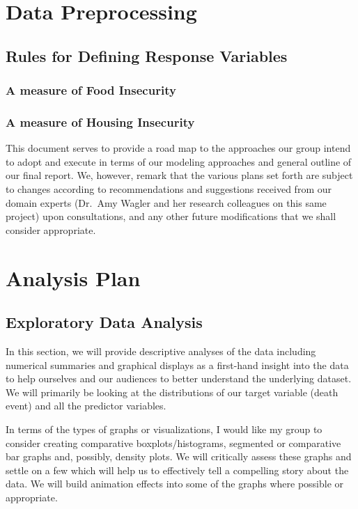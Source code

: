 \documentclass[
  10pt,
]{article}
\begin{document}
\section{Data Preprocessing}

\subsection{Rules for Defining Response Variables}

\subsubsection{A measure of Food Insecurity}

\subsubsection{A measure of Housing Insecurity}

This document serves to provide a road map to the approaches our group intend to adopt and execute in terms of our modeling approaches and general outline of our final report. We, however, remark that the various plans set forth are subject to changes according to recommendations and suggestions received from our domain experts (Dr.~Amy Wagler and her research colleagues on this same project) upon consultations, and any other future modifications that we shall consider appropriate.

\section{Analysis Plan}

\subsection{Exploratory Data Analysis}

In this section, we will provide descriptive analyses of the data including numerical summaries and graphical displays as a first-hand insight into the data to help ourselves and our audiences to better understand the underlying dataset. We will primarily be looking at the distributions of our target variable (death event) and all the predictor variables.

In terms of the types of graphs or visualizations, I would like my group to consider creating comparative boxplots/histograms, segmented or comparative bar graphs and, possibly, density plots. We will critically assess these graphs and settle on a few which will help us to effectively tell a compelling story about the data. We will build animation effects into some of the graphs where possible or appropriate.
\end{document}
